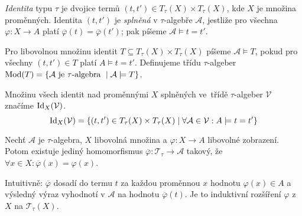 \begin{definition}
    {\em Identita} typu $\tau$ je dvojice termů
    $(t, t') \in T_\tau(X) \times T_\tau(X)$,
    kde $X$ je množina proměnných.
    Identita $(t, t')$ je {\em splněná} v $\tau$-algebře $\mathcal{A}$,
    jestliže pro všechna $\varphi : X \to A$
    platí $\overline{\varphi}(t) = \overline{\varphi}(t')$; pak píšeme
    $\mathcal{A} \models t = t'$.
\end{definition}

\begin{definition}
    Pro libovolnou množinu identit
    $T \subseteq T_\tau(X) \times T_\tau(X)$
    píšeme $\mathcal{A} \models T$, pokud
    pro všechny $(t, t') \in T$ platí $A \models t = t'$.
    Definujeme třídu $\tau$-algeber
    $\operatorname{Mod}(T) = \{\mathcal{A} \text{ je $ \tau$-algebra } \mid
    \mathcal{A} \models T \}$.
\end{definition}

\begin{definition}[$\Id$]
    Množinu všech identit nad proměnnými $X$ splněných \linebreak ve~třídě
    $\tau$-algeber $\mathcal{V}$ značíme $\operatorname{Id}_X(\mathcal{V})$.
    \[
        \operatorname{Id}_X(\mathcal{V})
        = \{ (t, t') \in T_\tau(X) \times T_\tau(X)
            \mid \forall \mathcal{A} \in \mathcal{V}
            : A \models t = t' \}
    \]
\end{definition}


\begin{theorem}
Nechť $\mathcal{A}$ je $\tau$-algebra,
$X$ libovolná množina a $\varphi : X \to A$ libovolné zobrazení.
Potom existuje jediný homomorfismus
$\overline{\varphi} : \mathcal{T}_\tau \to \mathcal{A}$ takový,
že \linebreak $\forall x \in X : \overline{\varphi}(x) = \varphi(x)$.

\center
{}

\end{theorem}

\noindent
Intuitivně: $\overline{\varphi}$ dosadí do termu $t$ za každou proměnnou
$x$ hodnotu $\varphi(x) \in A$ a výsledný výraz vyhodnotí v
$\mathcal{A}$ na hodnotu $\overline{\varphi}(t)$.
Je to induktivní rozšíření $\varphi$ z~$X$ na $\mathcal{T}_\tau(X)$.

